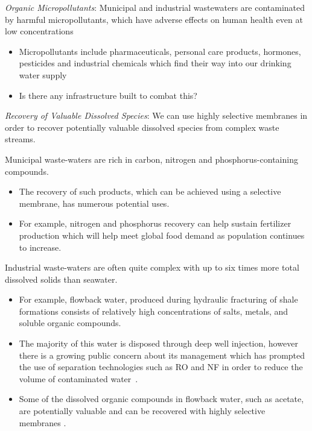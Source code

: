   \textit{Organic Micropollutants}:
  Municipal and industrial wastewaters are contaminated by harmful
  micropollutants, which have adverse effects on human health even at low 
  concentrations\cite{schwarzenbach_challenge_2006}
  \begin{itemize}
    \item Micropollutants include pharmaceuticals, personal care products, 
    hormones, pesticides and industrial chemicals which find their way into
    our drinking water supply
    \item Is there any infrastructure built to combat this?
  \end{itemize}
  
  \textit{Recovery of Valuable Dissolved Species}: We can use highly selective
  membranes in order to recover potentially valuable dissolved species from 
  complex waste streams. 
  
  Municipal waste-waters are rich in carbon, nitrogen and phosphorus-containing 
  compounds. 
  \begin{itemize}  
    \item The recovery of such products, which can be achieved using a 
    selective membrane, has numerous potential uses.\cite{sales_resource_2015}
    \item For example, nitrogen and phosphorus recovery can help sustain fertilizer 
    production which will help meet global food demand as population continues
    to increase.\cite{xie_membrane-based_2016}
  \end{itemize}

  Industrial waste-waters are often quite complex with up to six times more 
  total dissolved solids than seawater\cite{werber_materials_2016}. 
  \begin{itemize}
    \item For example, flowback water, produced during hydraulic fracturing of
    shale formations consists of relatively high concentrations of salts, metals,
    and soluble organic compounds. 
    \item The majority of this water is disposed through deep well injection, 
    however there is a growing public concern about its management which has 
    prompted the use of separation technologies such as RO and NF in order to 
    reduce the volume of contaminated water~\cite{gregory_water_2011}.
    \item Some of the dissolved organic compounds in flowback water, such as acetate, 
    are potentially valuable and can be recovered with highly selective membranes
    \cite{dischinger_application_2017}.
  \end{itemize}
  
